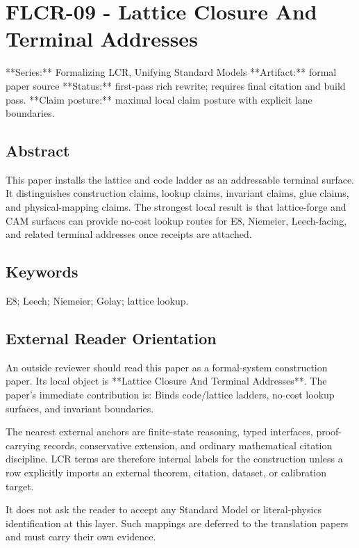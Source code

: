 \documentclass[11pt]{article}
\begin{document}
\section*{FLCR-09 - Lattice Closure And Terminal Addresses}

**Series:** Formalizing LCR, Unifying Standard Models
**Artifact:** formal paper source
**Status:** first-pass rich rewrite; requires final citation and build pass.
**Claim posture:** maximal local claim posture with explicit lane boundaries.

\subsection*{Abstract}

This paper installs the lattice and code ladder as an addressable terminal surface. It distinguishes construction claims, lookup claims, invariant claims, glue claims, and physical-mapping claims. The strongest local result is that lattice-forge and CAM surfaces can provide no-cost lookup routes for E8, Niemeier, Leech-facing, and related terminal addresses once receipts are attached.

\subsection*{Keywords}

E8; Leech; Niemeier; Golay; lattice lookup.

\subsection*{External Reader Orientation}

An outside reviewer should read this paper as a formal-system construction paper. Its local object is **Lattice Closure And Terminal Addresses**. The paper's immediate contribution is: Binds code/lattice ladders, no-cost lookup surfaces, and invariant boundaries.

The nearest external anchors are finite-state reasoning, typed interfaces, proof-carrying records, conservative extension, and ordinary mathematical citation discipline. LCR terms are therefore internal labels for the construction unless a row explicitly imports an external theorem, citation, dataset, or calibration target.

It does not ask the reader to accept any Standard Model or literal-physics identification at this layer. Such mappings are deferred to the translation papers and must carry their own evidence.
\end{document}
